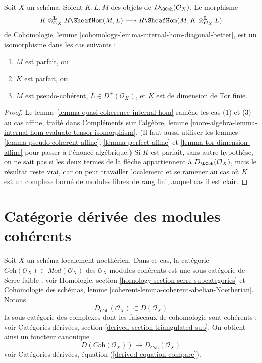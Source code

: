 \begin{lemma}
\label{lemma-internal-hom-evaluate-tensor-isomorphism}
Soit $X$ un schéma. Soient $K, L, M$ des objets de $D_\QCoh(\mathcal{O}_X)$.
Le morphisme
$$
K \otimes_{\mathcal{O}_X}^\mathbf{L} R\SheafHom(M, L)
\longrightarrow
R\SheafHom(M, K \otimes_{\mathcal{O}_X}^\mathbf{L} L)
$$
de Cohomologie, lemme \ref{cohomology-lemma-internal-hom-diagonal-better},
est un isomorphisme dans les cas suivants :
\begin{enumerate}
\item $M$ est parfait, ou
\item $K$ est parfait, ou
\item $M$ est pseudo-cohérent, $L \in D^+(\mathcal{O}_X)$, et $K$ est de dimension
de Tor finie.
\end{enumerate}
\end{lemma}

\begin{proof}
Le lemme \ref{lemma-quasi-coherence-internal-hom}
ramène les cas (1) et (3) au cas affine, traité dans
Compléments sur l'algèbre, lemme
\ref{more-algebra-lemma-internal-hom-evaluate-tensor-isomorphism}.
(Il faut aussi utiliser les lemmes \ref{lemma-pseudo-coherent-affine},
\ref{lemma-perfect-affine} et \ref{lemma-tor-dimension-affine}
pour passer à l'énoncé algébrique.)
Si $K$ est parfait, sans autre hypothèse, on
ne sait pas si les deux termes de la flèche appartiennent à $D_\QCoh(\mathcal{O}_X)$,
mais le résultat reste vrai, car on peut travailler localement et se ramener
au cas où $K$ est un complexe borné de modules libres de rang fini,
auquel cas il est clair.
\end{proof}





\section{Catégorie dérivée des modules cohérents}
\label{section-derived-coherent}

\noindent
Soit $X$ un schéma localement noethérien. Dans ce cas, la catégorie
$\textit{Coh}(\mathcal{O}_X) \subset \textit{Mod}(\mathcal{O}_X)$
des $\mathcal{O}_X$-modules cohérents est une sous-catégorie de Serre faible ; voir
Homologie, section \ref{homology-section-serre-subcategories}
et
Cohomologie des schémas, lemme \ref{coherent-lemma-coherent-abelian-Noetherian}.
Notons
$$
D_{\textit{Coh}}(\mathcal{O}_X) \subset D(\mathcal{O}_X)
$$
la sous-catégorie des complexes dont les faisceaux de cohomologie sont cohérents ; voir
Catégories dérivées, section \ref{derived-section-triangulated-sub}.
On obtient ainsi un foncteur canonique
\begin{equation}
\label{equation-compare-coherent}
D(\textit{Coh}(\mathcal{O}_X))
\longrightarrow
D_{\textit{Coh}}(\mathcal{O}_X)
\end{equation}
voir Catégories dérivées, équation (\ref{derived-equation-compare}).

